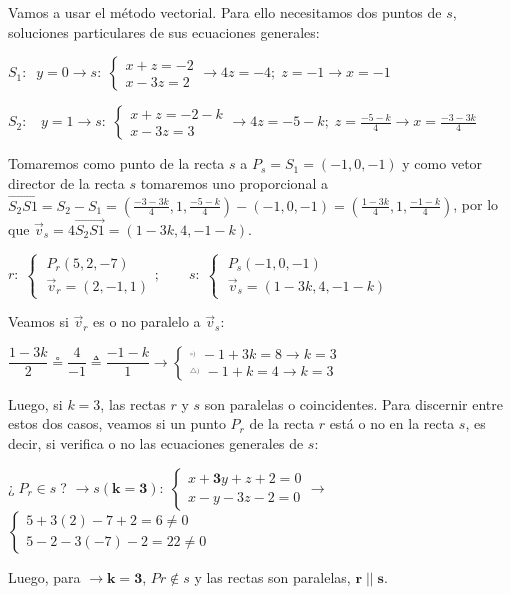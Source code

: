 \begin{proofw}\renewcommand{\qedsymbol}{$\diamond$}
Vamos a usar el método vectorial. Para ello necesitamos dos puntos de $s$, soluciones particulares de sus ecuaciones generales:

\noindent $ S_1:\;\; y=0 \to s:\;\begin{cases} x+z=-2\\x-3z=2 \end{cases} \to 4z=-4;\; z=-1 \to x=-1$

\noindent $ S_2:\;\; $ \small{$y=1 \to s:\;\begin{cases} x+z=-2-k\\x-3z=3 \end{cases} \to 4z=-5-k;\; z=\frac{-5-k}{4} \to x=\frac{-3-3k}{4}$}

\noindent\normalsize{Tomaremos} como punto de la recta $s$ a $P_s=S_1=(-1,0,-1)$ y como vetor director de la recta $s$ tomaremos uno proporcional a $\overrightarrow{S_2S1}=S_2-S_1=(\frac{-3-3k}{4},1,\frac{-5-k}{4}) - (-1,0,-1)=(\frac{1-3k}{4},1,\frac{-1-k}{4}) $, por lo que $\vec v_s=4\overrightarrow{S_2S1}=(1-3k,4,-1-k)$.

\noindent$r:\; \begin{cases} \;P_r(5,2,-7) \\ \;\vec v_r=(2,-1,1) \end{cases}; \qquad s:\; \begin{cases} \;P_s(-1,0,-1) \\ \; \vec v_s=(1-3k,4,-1-k) \end{cases}$

\noindent Veamos si $\vec v_r$ es o no paralelo a $\vec v_s$:

\noindent$\dfrac{1-3k}{2}  \circeq  \dfrac{4}{-1}\triangleq   \dfrac{-1-k}{1} \to  
\begin{cases} ^{_{\circ)}}\;  -1+3k=8 \to k=3 \\ ^{_{\triangle)}}\; -1+k=4 \to k=3 \end{cases}$

\noindent Luego, si $k=3$, las rectas $r$ y $s$ son paralelas o coincidentes. Para discernir entre estos dos casos, veamos si un punto $P_r$ de la recta $r$ está o no en la recta $s$, es decir, si verifica o no las ecuaciones generales de $s$:

\noindent \small{¿$\;P_r \in s\;$? $\to s\boldsymbol{(k=3)}:\; \begin{cases} x+\boldsymbol{3}y+z+2=0\\x-y-3z-2=0 \end{cases} \to $}
\footnotesize{$\begin{cases} 5+3(2)-7+2=6\neq 0 \\ 5-2-3(-7)-2=22\neq 0 \end{cases}$}

\noindent \normalsize{Luego}, para $\to \boldsymbol{k=3}$, $Pr \notin s$ y las rectas son paralelas, $\boldsymbol{r\;||\;s}$.
 
\end{proofw}

